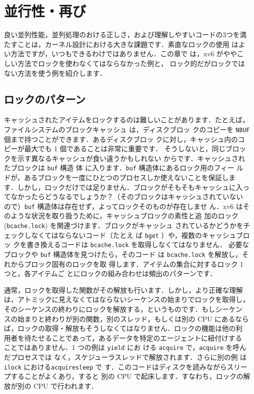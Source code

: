 \chapter{並行性・再び}
\label{CH:LOCK2}

良い並列性能，並列処理のおける正しさ，および理解しやすいコードの3つを満
たすことは，カーネル設計における大きな課題です．素直なロックの使用
はよい方法ですが，いつもできるわけではありません．この章で
は，xv6 がややこしい方法でロックを使わなくてはならなかった例と，
ロック的だがロックではない方法を使う例を紹介します．

\section{ロックのパターン}

キャッシュされたアイテムをロックするのは難しいことがあります．たとえば，
ファイルシステムのブロックキャッシュ
 は，ディスクブロッ
クのコピーを \texttt{NBUF} 個まで持つことができます．あるディスクブロッ
クに対し，キャッシュ内のコピーが最大でも 1 個であることは非常に重要です．
そうしないと，同じブロックを示す異なるキャッシュが食い違うかもしれない
からです．キャッシュされたブロックは \texttt{buf} 構造
体  に入ります．\texttt{buf} 構造体にあるロック用のフィー
ルドが，あるブロックを一度にひとつのプロセスしか使えないことを保証しま
す．しかし，ロックだけでは足りません．ブロックがそもそもキャッシュに入っ
てなかったらどうなるでしょうか？（そのブロックはキャッシュされていない
ので）\texttt{buf} 構造体は存在せず，よってロックそのものが存在しませ
ん．xv6 はそのような状況を取り扱うために，キャッシュブロックの素性と追
加のロック (\texttt{bcache.lock}) を関連づけます．ブロックがキャッシュ
されているかどうかをチェックしなくてはならないコード（たとえ
ば \texttt{bget} ）や，複数のキャッシュブロッ
クを書き換えるコードは \texttt{bcache.lock} を取得しなくてはなりません．
必要なブロックや \texttt{buf} 構造体を見つけたら，そのコード
は \texttt{bcache.lock} を解放し，それからブロック固有のロックを取
得します．アイテムの集合に対するロック 1 つと，各アイテムご
とにロックの組み合わせは頻出のパターンです．

通常，ロックを取得した関数がその解放も行います．しかし，より正確な理解
は，アトミックに見えなくてはならないシーケンスの始まりでロックを取得し，
そのシーケンスの終わりにロックを解放する，というものです．もしシーケン
スの始まりと終わりが別の関数，別のスレッド，もしくは別の CPU にあるなら
ば，ロックの取得・解放もそうしなくてはなりません．ロックの機能は他の利
用者を待たせることであって，あるデータを特定のエージェントに紐付けする
ことではありません．1 つの例は \texttt{yield}  にお
ける \texttt{acquire} で，\texttt{acquire} を呼んだプロセスでは
なく，スケジューラスレッドで解放されます．さらに別の例
は \texttt{ilock}  における\texttt{acquiresleep} で
す．このコードはディスクを読みながらスリープすることがよくあり，すると
別の CPU で起床します．すなわち，ロックの解放が別の CPU で行われます．

